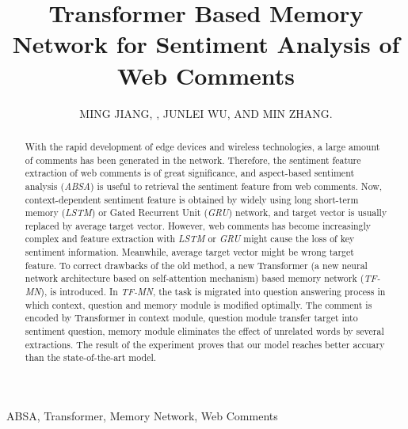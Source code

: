 \documentclass{ieeeaccess}
\begin{document}

\title{Transformer Based Memory Network for Sentiment Analysis of Web Comments}
\author{
	\uppercase{Ming Jiang}, 
	, 
	\uppercase{Junlei Wu, 
		and Min Zhang}.}
\address{Xiasha Higher Education Zone, Hangzhou, 310018, Zhejiang Province, People's Republic of China}



\begin{abstract}
With the rapid development of edge devices and wireless technologies, a large amount of comments has been generated in the network. Therefore, the sentiment feature extraction of web comments is of great significance, and aspect-based sentiment analysis (\textit{ABSA}) is useful to retrieval the sentiment feature from web comments. Now, context-dependent sentiment feature is obtained by widely using long short-term memory (\textit{LSTM}) or Gated Recurrent Unit (\textit{GRU}) network, and target vector is usually replaced by average target vector. However, web comments has become increasingly complex and feature extraction with \textit{LSTM} or \textit{GRU} might cause the loss of key sentiment information. Meanwhile, average target vector might be wrong target feature. To correct drawbacks of the old method, a new Transformer (a new neural network architecture based on self-attention mechanism) based memory network (\textit{TF-MN}), is introduced. In \textit{TF-MN}, the task is migrated into question answering process in which context, question and memory module is modified optimally. The comment is encoded by Transformer in context module, question module transfer target into sentiment question, memory module eliminates the effect of unrelated words by several extractions. The result of the experiment proves that our model reaches better accuary than the state-of-the-art model.
\end{abstract}

\begin{keywords}
ABSA, Transformer, Memory Network, Web Comments
\end{keywords}

\titlepgskip=-15pt

\maketitle
\end{document}
